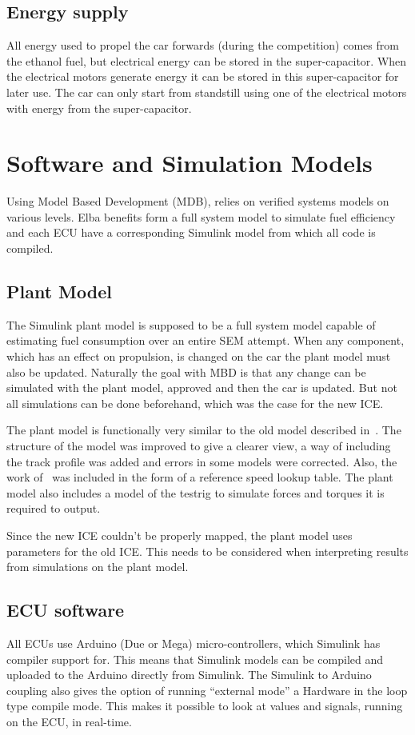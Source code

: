 \subsection{Energy supply}
All energy used to propel the car forwards (during the competition) comes from
the ethanol fuel, but electrical energy can be stored in the super-capacitor.
When the electrical motors generate energy it can be stored in this
super-capacitor for later use. The car can only start from standstill using one
of the electrical motors with energy from the super-capacitor.  

\section{Software and Simulation Models}
Using Model Based Development (MDB), relies on verified systems models on various
levels. Elba benefits form a full system model to simulate fuel efficiency and
each ECU have a corresponding Simulink model from which all code is compiled.

\subsection{Plant Model}
The Simulink plant model is supposed to be a full system model capable of
estimating fuel consumption over an entire SEM attempt. When any component,
which has an effect on propulsion, is changed on the car the plant model must
also be updated. Naturally the goal with MBD is that any change can be simulated
with the plant model, approved and then the car is updated. But not all
simulations can be done beforehand, which was the case for the new ICE\@. 

The plant model is functionally very similar to the old model described
in~\cite{elba2015}. The structure of the model was improved to give a clearer
view, a way of including the track profile was added and errors in some models
were corrected. Also, the work of~\citep{liu2016} was included in the form of a
reference speed lookup table. The plant model also includes a model of the
testrig to simulate forces and torques it is required to output.

Since the new ICE couldn't be properly mapped, the plant model uses parameters
for the old ICE\@. This needs to be considered when interpreting results from
simulations on the plant model.

\subsection{ECU software}
All ECUs use Arduino (Due or Mega) micro-controllers, which Simulink has
compiler support for. This means that Simulink models can be compiled and
uploaded to the Arduino directly from Simulink. The Simulink to Arduino coupling
also gives the option of running ``external mode'' a Hardware in the loop type
compile mode.  This makes it possible to look at values and signals, running on
the ECU, in real-time.

